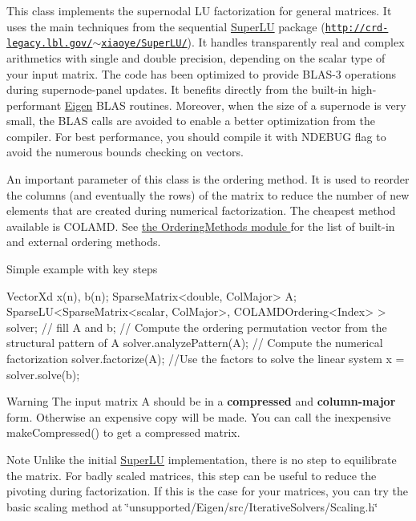 This class implements the supernodal LU factorization for general matrices. It uses the main techniques from the sequential \hyperlink{class_eigen_1_1_super_l_u}{Super\+LU} package (\href{http://crd-legacy.lbl.gov/~xiaoye/SuperLU/}{\tt http\+://crd-\/legacy.\+lbl.\+gov/$\sim$xiaoye/\+Super\+L\+U/}). It handles transparently real and complex arithmetics with single and double precision, depending on the scalar type of your input matrix. The code has been optimized to provide B\+L\+A\+S-\/3 operations during supernode-\/panel updates. It benefits directly from the built-\/in high-\/performant \hyperlink{namespace_eigen}{Eigen} B\+L\+AS routines. Moreover, when the size of a supernode is very small, the B\+L\+AS calls are avoided to enable a better optimization from the compiler. For best performance, you should compile it with N\+D\+E\+B\+UG flag to avoid the numerous bounds checking on vectors.

An important parameter of this class is the ordering method. It is used to reorder the columns (and eventually the rows) of the matrix to reduce the number of new elements that are created during numerical factorization. The cheapest method available is C\+O\+L\+A\+MD. See \hyperlink{group___ordering_methods___module}{the Ordering\+Methods module } for the list of built-\/in and external ordering methods.

Simple example with key steps 
\begin{DoxyCode}
VectorXd x(n), b(n);
SparseMatrix<double, ColMajor> A;
SparseLU<SparseMatrix<scalar, ColMajor>, COLAMDOrdering<Index> >   solver;
\textcolor{comment}{// fill A and b;}
\textcolor{comment}{// Compute the ordering permutation vector from the structural pattern of A}
solver.analyzePattern(A); 
\textcolor{comment}{// Compute the numerical factorization }
solver.factorize(A); 
\textcolor{comment}{//Use the factors to solve the linear system }
x = solver.solve(b); 
\end{DoxyCode}


\begin{DoxyWarning}{Warning}
The input matrix A should be in a {\bfseries compressed} and {\bfseries column-\/major} form. Otherwise an expensive copy will be made. You can call the inexpensive make\+Compressed() to get a compressed matrix.
\end{DoxyWarning}
\begin{DoxyNote}{Note}
Unlike the initial \hyperlink{class_eigen_1_1_super_l_u}{Super\+LU} implementation, there is no step to equilibrate the matrix. For badly scaled matrices, this step can be useful to reduce the pivoting during factorization. If this is the case for your matrices, you can try the basic scaling method at \char`\"{}unsupported/\+Eigen/src/\+Iterative\+Solvers/\+Scaling.\+h\char`\"{}
\end{DoxyNote}

